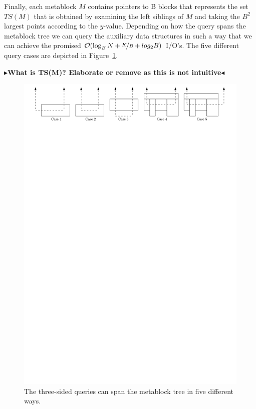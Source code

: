 \documentclass[twoside,11pt,openright]{report}
\newcommand{\todo}[1]{{\color[rgb]{.5,0,0}\textbf{$\blacktriangleright$#1$\blacktriangleleft$}}}
\begin{document}
Finally, each metablock $M$ contains pointers to B blocks that represents the set $TS(M)$ that is obtained by examining the left siblings of $M$ and taking the $B^2$ largest points according to the $y$-value. Depending on how the query spans the metablock tree we can query the auxiliary data structures in such a way that we can achieve the promised $\mathcal{O}(\log_B N + \nicefrac{K}{B} + log_2 B)$ I/O's. The five different query cases are depicted in Figure~\ref{fig:kanellakis_queries}.

\todo{What is TS(M)? Elaborate or remove as this is not intuitive}

\begin{figure}[h]
	\centering
		\includegraphics[width=1\textwidth]{../figures/kanellakis_queries}
	\caption{The three-sided queries can span the metablock tree in five different ways.}
	\label{fig:kanellakis_queries}
\end{figure}
\end{document}
